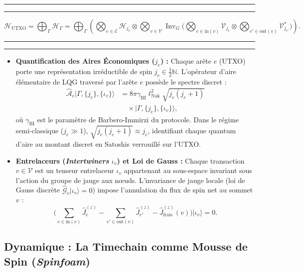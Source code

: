 \documentclass[10pt,twocolumn,a4paper]{article}
\newenvironment{widetext}{%
  \begin{strip}
  \rule{\dimexpr(0.5\textwidth-0.5\columnsep-0.4pt)}{0.4pt}%
  \rule{0.4pt}{6pt}\par\vspace{-2pt}%
}{%
  \par\vspace{-2pt}\hfill%
  \rule[-6pt]{0.4pt}{6.4pt}%
  \rule{\dimexpr(0.5\textwidth-0.5\columnsep-0.4pt)}{0.4pt}%
  \end{strip}
}
\theoremstyle{plain}
\theoremstyle{definition}
\theoremstyle{remark}
\newcommand{\lNak}{\ell_{\text{Nak}}}
\newcommand{\Inv}{\operatorname{Inv}}
\begin{document}
\begin{widetext}
\begin{equation}
    \mathcal{H}_{\text{UTXO}} = \bigoplus_{\Gamma} \mathcal{H}_\Gamma = \bigoplus_{\Gamma} \left( \bigotimes_{e \in \mathcal{E}} \mathcal{H}_{j_e} \otimes \bigotimes_{v \in \mathcal{V}} \Inv_{G}\Big( \bigotimes_{e \in \text{in}(v)} \mathcal{V}_{j_e} \otimes \bigotimes_{e' \in \text{out}(v)} \mathcal{V}_{j_{e'}}^* \Big) \right).
    \label{eq:SpinNetworkHilbert}
\end{equation}
\end{widetext}

\begin{itemize}
    \item \textbf{Quantification des Aires Économiques ($j_e$) :} Chaque arête $e$ (UTXO) porte une représentation irréductible de spin $j_e \in \frac{1}{2}\mathbb{N}$. L'opérateur d'aire élémentaire de LQG traversé par l'arête $e$ possède le spectre discret :
    \begin{equation}
    \begin{split}
        \hat{\mathcal{A}}_e |\Gamma, \{j_e\}, \{\iota_v\}\rangle &= 8\pi \gamma_{\text{BI}} \lNak^2 \sqrt{j_e(j_e + 1)} \\
        &\quad \times |\Gamma, \{j_e\}, \{\iota_v\}\rangle,
    \end{split}
    \label{eq:AreaSpectrum}
    \end{equation}
    où $\gamma_{\text{BI}}$ est le paramètre de Barbero-Immirzi du protocole. Dans le régime semi-classique ($j_e \gg 1$), $\sqrt{j_e(j_e+1)} \approx j_e$, identifiant chaque quantum d'aire au montant discret en Satoshis verrouillé sur l'UTXO.
    \item \textbf{Entrelaceurs (\textit{Intertwiners} $\iota_v$) et Loi de Gauss :} Chaque transaction $v \in \mathcal{V}$ est un tenseur entrelaceur $\iota_v$ appartenant au sous-espace invariant sous l'action du groupe de jauge aux nœuds. L'invariance de jauge locale (loi de Gauss discrète $\hat{\mathcal{G}}_v |\iota_v\rangle = 0$) impose l'annulation du flux de spin net au sommet $v$ :
    \begin{equation}
        \Big( \sum_{e \in \text{in}(v)} \hat{J}_e^{(z)} - \sum_{e' \in \text{out}(v)} \hat{J}_{e'}^{(z)} - \hat{J}_{\text{frais}}^{(z)}(v) \Big) |\iota_v\rangle = 0.
        \label{eq:GaussLawUTXO}
    \end{equation}
\end{itemize}

\subsection{Dynamique : La Timechain comme Mousse de Spin (\textit{Spinfoam})}
\end{document}
